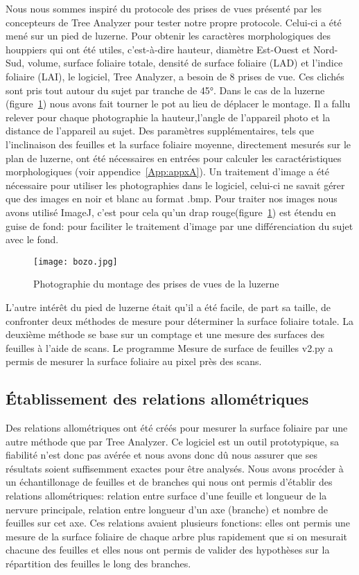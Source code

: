 ﻿\documentclass[12pt]{report}
\begin{document}
Nous nous sommes inspiré du protocole des prises de vues présenté par les
concepteurs de Tree Analyzer \cite{MAR_ref24}\cite{MAR_25} pour tester notre
propre protocole. Celui-ci a été mené sur un pied de luzerne. Pour 
obtenir les caractères morphologiques des houppiers qui ont été utiles,
c'est-à-dire hauteur, diamètre Est-Ouest et Nord-Sud, volume, surface foliaire
totale, densité de surface foliaire (LAD) et l'indice foliaire (LAI), le
logiciel, Tree Analyzer, a besoin de 8 prises de vue. Ces clichés sont
pris tout autour du sujet par tranche de 45°. Dans le
cas de la luzerne (figure~\ref{fig:luzerne}) nous avons fait tourner le pot au
lieu de déplacer le montage. Il a fallu relever pour chaque photographie la
hauteur,l'angle de l'appareil photo et la distance de l'appareil au sujet. Des
paramètres supplémentaires, tels que l'inclinaison des feuilles et la surface
foliaire moyenne, directement mesurés sur le plan de luzerne, ont été
nécessaires en entrées pour calculer les caractéristiques morphologiques (voir appendice~\ref{App:appxA}). 
Un traitement d'image a été nécessaire pour 
utiliser les photographies dans le logiciel, celui-ci ne savait gérer que des
images en noir et blanc au format .bmp. Pour traiter nos images nous avons 
utilisé ImageJ\cite{ImageJ_ref39}, c'est pour cela qu'un drap rouge(figure~\ref{fig:luzerne})
est étendu en guise de fond: pour faciliter le traitement d'image par une
différenciation du sujet avec le fond.

\begin{figure}
  \centering
  \texttt{[image: bozo.jpg]}
  \caption{Photographie du montage des prises de vues de la luzerne\label{fig:luzerne}}
\end{figure}

L'autre intérêt du pied de luzerne était qu'il a été facile, de part sa taille, de confronter deux
méthodes de mesure pour déterminer la surface foliaire totale. La deuxième
méthode se base sur un comptage et une mesure des surfaces des feuilles à l'aide
de scans. Le programme Mesure de surface de feuilles v2.py\cite{Python_ref40}
a permis de mesurer la surface foliaire au pixel près des scans.


\subsection{Établissement des relations allométriques}

Des relations allométriques ont été créés pour mesurer la surface foliaire par
une autre méthode que par Tree Analyzer. Ce logiciel est un outil prototypique,
sa fiabilité n'est donc pas avérée et nous avons donc dû nous assurer que ses
résultats soient suffisemment exactes pour être analysés. Nous avons procéder à
un échantillonage de feuilles et de branches qui nous ont permis d'établir des relations
allométriques: relation entre surface d'une feuille et longueur de la nervure
principale, relation entre longueur d'un axe (branche) et nombre de feuilles sur
cet axe. Ces relations avaient plusieurs fonctions: elles
ont permis une mesure de la surface foliaire de chaque arbre plus rapidement que
si on mesurait chacune des feuilles et elles nous ont permis de valider des
hypothèses sur la répartition des feuilles le long des branches.
\end{document}
